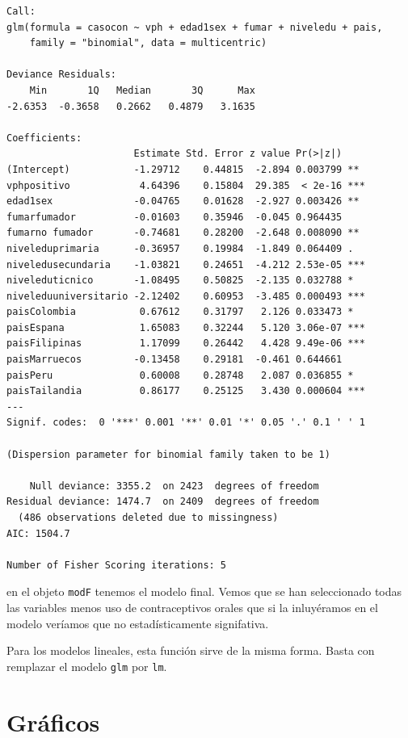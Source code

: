 \documentclass[
]{book}
\begin{document}
\begin{verbatim}
Call:
glm(formula = casocon ~ vph + edad1sex + fumar + niveledu + pais, 
    family = "binomial", data = multicentric)

Deviance Residuals: 
    Min       1Q   Median       3Q      Max  
-2.6353  -0.3658   0.2662   0.4879   3.1635  

Coefficients:
                      Estimate Std. Error z value Pr(>|z|)    
(Intercept)           -1.29712    0.44815  -2.894 0.003799 ** 
vphpositivo            4.64396    0.15804  29.385  < 2e-16 ***
edad1sex              -0.04765    0.01628  -2.927 0.003426 ** 
fumarfumador          -0.01603    0.35946  -0.045 0.964435    
fumarno fumador       -0.74681    0.28200  -2.648 0.008090 ** 
niveleduprimaria      -0.36957    0.19984  -1.849 0.064409 .  
niveledusecundaria    -1.03821    0.24651  -4.212 2.53e-05 ***
niveleduticnico       -1.08495    0.50825  -2.135 0.032788 *  
niveleduuniversitario -2.12402    0.60953  -3.485 0.000493 ***
paisColombia           0.67612    0.31797   2.126 0.033473 *  
paisEspana             1.65083    0.32244   5.120 3.06e-07 ***
paisFilipinas          1.17099    0.26442   4.428 9.49e-06 ***
paisMarruecos         -0.13458    0.29181  -0.461 0.644661    
paisPeru               0.60008    0.28748   2.087 0.036855 *  
paisTailandia          0.86177    0.25125   3.430 0.000604 ***
---
Signif. codes:  0 '***' 0.001 '**' 0.01 '*' 0.05 '.' 0.1 ' ' 1

(Dispersion parameter for binomial family taken to be 1)

    Null deviance: 3355.2  on 2423  degrees of freedom
Residual deviance: 1474.7  on 2409  degrees of freedom
  (486 observations deleted due to missingness)
AIC: 1504.7

Number of Fisher Scoring iterations: 5
\end{verbatim}

en el objeto \texttt{modF} tenemos el modelo final. Vemos que se han seleccionado todas las variables menos uso de contraceptivos orales que si la inluyéramos en el modelo veríamos que no estadísticamente signifativa.

Para los modelos lineales, esta función sirve de la misma forma. Basta con remplazar el modelo \texttt{glm} por \texttt{lm}.

\hypertarget{gruxe1ficos}{%
\chapter{Gráficos}\label{gruxe1ficos}}
\end{document}
